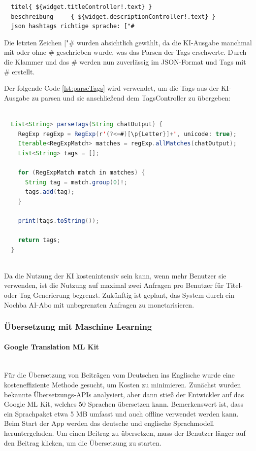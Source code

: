 \begin{verbatim}
  titel{ ${widget.titleController!.text} }
  beschreibung --- { ${widget.descriptionController!.text} }
  json hashtags richtige sprache: ["#
  \end{verbatim}

Die letzten Zeichen ["\# wurden absichtlich gewählt, da die
KI-Ausgabe manchmal mit oder ohne \# geschrieben wurde, was
das Parsen der Tags erschwerte. Durch die Klammer und das \#
werden nun zuverlässig im JSON-Format und Tags mit \#
erstellt.

Der folgende Code \ref{lst:parseTags} wird verwendet, um die Tags aus der KI-Ausgabe zu parsen und sie anschließend dem TagsController zu übergeben:

\begin{lstlisting}[language=Java,caption=parseTags von 
  KI output,label=lst:parseTags]  
  
  List<String> parseTags(String chatOutput) {
    RegExp regExp = RegExp(r'(?<=#)[\p{Letter}]+', unicode: true);
    Iterable<RegExpMatch> matches = regExp.allMatches(chatOutput);
    List<String> tags = [];

    for (RegExpMatch match in matches) {
      String tag = match.group(0)!;
      tags.add(tag);
    }

    print(tags.toString());

    return tags;
  }
    
\end{lstlisting}


Da die Nutzung der KI kostenintensiv sein kann, wenn mehr Benutzer sie verwenden, ist die Nutzung auf maximal zwei Anfragen pro Benutzer für Titel- oder Tag-Generierung begrenzt. Zukünftig ist geplant, das System durch ein Nochba AI-Abo mit unbegrenzten Anfragen zu monetarisieren.

\subsubsection{Übersetzung mit Maschine Learning}

\paragraph{Google Translation ML Kit}\mbox{} \\

Für die Übersetzung von Beiträgen vom Deutschen ins Englische wurde eine kosteneffiziente Methode gesucht, um Kosten zu minimieren. Zunächst wurden bekannte Übersetzungs-APIs analysiert, aber dann stieß der Entwickler auf das Google ML Kit, welches 50 Sprachen übersetzen kann. Bemerkenswert ist, dass ein Sprachpaket etwa 5 MB umfasst und auch offline verwendet werden kann. Beim Start der App werden das deutsche und englische Sprachmodell heruntergeladen. Um einen Beitrag zu übersetzen, muss der Benutzer länger auf den Beitrag klicken, um die Übersetzung zu starten.



